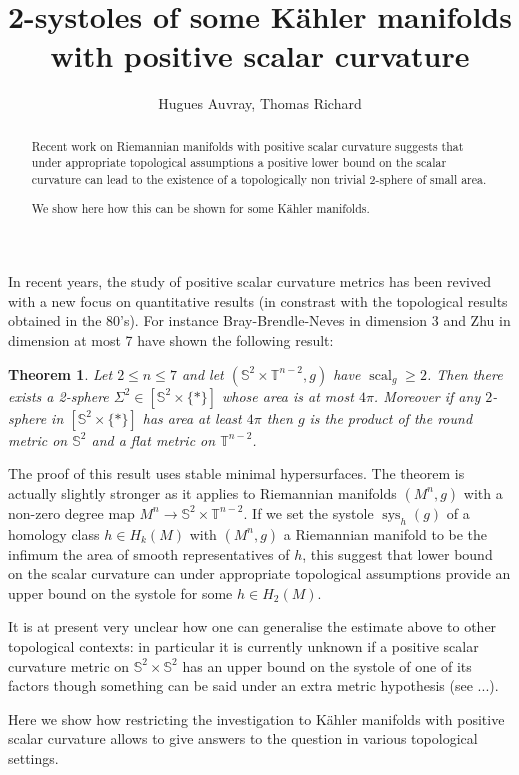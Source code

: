 \documentclass{amsart}
\title{2-systoles of some K\"ahler manifolds with positive scalar curvature}
\author{Hugues Auvray, Thomas Richard}
\date{}
\newtheorem{theorem}{Theorem}[section]
\numberwithin{equation}{section}
\theoremstyle{definition}
\DeclareMathOperator{\scal}{scal}
\DeclareMathOperator{\sys}{sys}
\begin{document}
\maketitle
\begin{abstract}
Recent work on Riemannian manifolds with positive scalar curvature suggests that under appropriate topological assumptions a positive lower bound on the scalar curvature can lead to the existence of a topologically non trivial 2-sphere of small area.

We show here how this can be shown for some K\"ahler manifolds.
\end{abstract}

In recent years, the study of positive scalar curvature metrics has been revived with a new focus on quantitative results (in constrast with the topological results obtained in the 80's). For instance Bray-Brendle-Neves in dimension 3 and Zhu in dimension at most 7 have shown the following result:

\begin{theorem}
Let $2\leq n\leq 7$ and let $(\mathbb{S}^2\times\mathbb{T}^{n-2},g)$ have $\scal_g\geq 2$. Then there exists a 2-sphere $\Sigma^2\in [\mathbb{S}^2\times\{\ast\}]$ whose area is at most $4\pi$. Moreover if any $2$-sphere in $[\mathbb{S}^2\times\{\ast\}]$ has area at least $4\pi$ then $g$ is the product of the round metric on $\mathbb{S}^2$ and a flat metric on $\mathbb{T}^{n-2}$.
\end{theorem}

The proof of this result uses stable minimal hypersurfaces. The theorem is actually slightly stronger as it applies to Riemannian manifolds $(M^n,g)$ with a non-zero degree map $M^n\to \mathbb{S}^2\times\mathbb{T}^{n-2}$. If we set the systole $\sys_h(g)$ of a homology class $h\in H_k(M)$ with $(M^n,g)$ a Riemannian manifold to be the infimum the area of smooth representatives of $h$, this suggest that lower bound on the scalar curvature can under appropriate topological assumptions provide an upper bound on the systole for some $h\in H_2(M)$.

It is at present very unclear how one can generalise the estimate above to other topological contexts: in particular it is currently unknown if a positive scalar curvature metric on $\mathbb{S}^2\times\mathbb{S}^2$ has an upper bound on the systole of one of its factors though something can be said under an extra metric hypothesis (see ...).

Here we show how restricting the investigation to K\"ahler manifolds with positive scalar curvature allows to give answers to the question in various topological settings.
\end{document}
